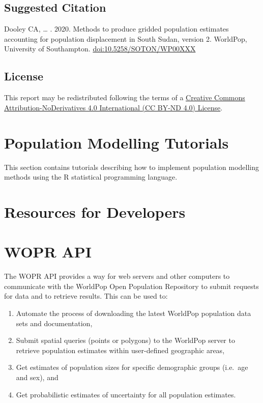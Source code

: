 \documentclass[]{book}
\providecommand{\tightlist}{%
  \setlength{\itemsep}{0pt}\setlength{\parskip}{0pt}}
\begin{document}
\section*{Suggested Citation}\label{suggested-citation-9}

Dooley CA, \ldots{} . 2020. Methods to produce gridded population
estimates accounting for population displacement in South Sudan, version
2. WorldPop, University of Southampton. \url{doi:10.5258/SOTON/WP00XXX}

\section*{License}\label{license-7}

This report may be redistributed following the terms of a
\href{https://creativecommons.org/licenses/by-nd/4.0/}{Creative Commons
Attribution-NoDerivatives 4.0 International (CC BY-ND 4.0) License}.

\chapter*{Population Modelling
Tutorials}\label{population-modelling-tutorials}

This section contains tutorials describing how to implement population
modelling methods using the R statistical programming language.

\chapter*{Resources for Developers}\label{resources-for-developers}

\hypertarget{wopr-api}{\chapter{WOPR API}\label{wopr-api}}

The WOPR API provides a way for web servers and other computers to
communicate with the WorldPop Open Population Repository to submit
requests for data and to retrieve results. This can be used to:

\begin{enumerate}
\def\labelenumi{\arabic{enumi}.}
\tightlist
\item
  Automate the process of downloading the latest WorldPop population
  data sets and documentation,
\item
  Submit spatial queries (points or polygons) to the WorldPop server to
  retrieve population estimates within user-defined geographic areas,
\item
  Get estimates of population sizes for specific demographic groups
  (i.e.~age and sex), and
\item
  Get probabilistic estimates of uncertainty for all population
  estimates.
\end{enumerate}
\end{document}

